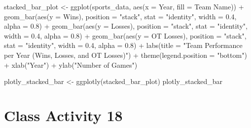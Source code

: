 \documentclass[
]{book}
\newenvironment{Shaded}{\begin{snugshade}}{\end{snugshade}}
\newcommand{\AttributeTok}[1]{\textcolor[rgb]{0.77,0.63,0.00}{#1}}
\newcommand{\FloatTok}[1]{\textcolor[rgb]{0.00,0.00,0.81}{#1}}
\newcommand{\FunctionTok}[1]{\textcolor[rgb]{0.00,0.00,0.00}{#1}}
\newcommand{\NormalTok}[1]{#1}
\newcommand{\OtherTok}[1]{\textcolor[rgb]{0.56,0.35,0.01}{#1}}
\newcommand{\SpecialCharTok}[1]{\textcolor[rgb]{0.00,0.00,0.00}{#1}}
\newcommand{\StringTok}[1]{\textcolor[rgb]{0.31,0.60,0.02}{#1}}
\begin{document}
\begin{Shaded}
\begin{Highlighting}[]
\NormalTok{stacked\_bar\_plot }\OtherTok{\textless{}{-}} \FunctionTok{ggplot}\NormalTok{(sports\_data, }\FunctionTok{aes}\NormalTok{(}\AttributeTok{x =}\NormalTok{ Year, }\AttributeTok{fill =} \StringTok{\textasciigrave{}}\AttributeTok{Team Name}\StringTok{\textasciigrave{}}\NormalTok{)) }\SpecialCharTok{+}
  \FunctionTok{geom\_bar}\NormalTok{(}\FunctionTok{aes}\NormalTok{(}\AttributeTok{y =}\NormalTok{ Wins), }\AttributeTok{position =} \StringTok{"stack"}\NormalTok{, }\AttributeTok{stat =} \StringTok{"identity"}\NormalTok{, }\AttributeTok{width =} \FloatTok{0.4}\NormalTok{, }\AttributeTok{alpha =} \FloatTok{0.8}\NormalTok{) }\SpecialCharTok{+}
  \FunctionTok{geom\_bar}\NormalTok{(}\FunctionTok{aes}\NormalTok{(}\AttributeTok{y =}\NormalTok{ Losses), }\AttributeTok{position =} \StringTok{"stack"}\NormalTok{, }\AttributeTok{stat =} \StringTok{"identity"}\NormalTok{, }\AttributeTok{width =} \FloatTok{0.4}\NormalTok{, }\AttributeTok{alpha =} \FloatTok{0.8}\NormalTok{) }\SpecialCharTok{+}
  \FunctionTok{geom\_bar}\NormalTok{(}\FunctionTok{aes}\NormalTok{(}\AttributeTok{y =} \StringTok{\textasciigrave{}}\AttributeTok{OT Losses}\StringTok{\textasciigrave{}}\NormalTok{), }\AttributeTok{position =} \StringTok{"stack"}\NormalTok{, }\AttributeTok{stat =} \StringTok{"identity"}\NormalTok{, }\AttributeTok{width =} \FloatTok{0.4}\NormalTok{, }\AttributeTok{alpha =} \FloatTok{0.8}\NormalTok{) }\SpecialCharTok{+}
  \FunctionTok{labs}\NormalTok{(}\AttributeTok{title =} \StringTok{"Team Performance per Year (Wins, Losses, and OT Losses)"}\NormalTok{) }\SpecialCharTok{+}
  \FunctionTok{theme}\NormalTok{(}\AttributeTok{legend.position =} \StringTok{"bottom"}\NormalTok{) }\SpecialCharTok{+}
  \FunctionTok{xlab}\NormalTok{(}\StringTok{"Year"}\NormalTok{) }\SpecialCharTok{+}
  \FunctionTok{ylab}\NormalTok{(}\StringTok{"Number of Games"}\NormalTok{)}

\NormalTok{plotly\_stacked\_bar }\OtherTok{\textless{}{-}} \FunctionTok{ggplotly}\NormalTok{(stacked\_bar\_plot)}
\NormalTok{plotly\_stacked\_bar}
\end{Highlighting}
\end{Shaded}

\hypertarget{class-activity-18}{%
\chapter{Class Activity 18}\label{class-activity-18}}
\end{document}
